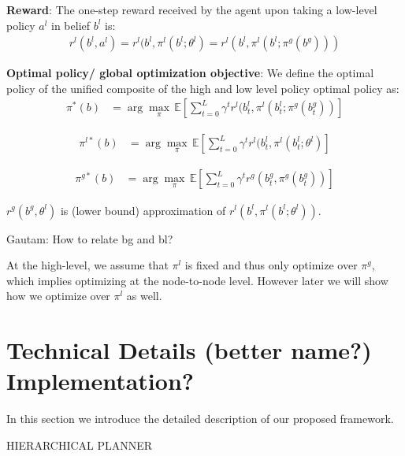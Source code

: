 \documentclass{article}
\newcommand{\ph}[1]{{\textbf{#1}:}} %
\newcommand{\gautam}[1]{{\color{cyan}Gautam: #1 }}
\begin{document}
\ph{Reward} The one-step reward received by the agent upon taking a low-level policy $a^l$ in belief $b^l$ is:
\begin{align}
    r^l(b^l, a^l) = r^l(b^l, \pi^l(b^l; \theta^l) = r^l(b^l, \pi^l(b^l; \pi^g(b^g)))
\end{align}

\ph{Optimal policy/ global optimization objective} We define the optimal policy of the unified composite of the high and low level policy optimal policy as:
\begin{align}
  \pi^{*}(b) &= \arg\max_\pi \, \mathbb{E} \left[ \sum_{t=0}^{L} \gamma^t r^l(b^l_t, \pi^l(b^l_t; \pi^g(b^g_t)) \right]
  \label{eq:optimal_policy_unified}
\end{align}

\begin{align}
  \pi^{l*}(b) &= \arg\max_\pi \, \mathbb{E} \left[ \sum_{t=0}^{L} \gamma^t r^l(b^l_t, \pi^l(b^l_t; \theta^l) \right]
  \label{eq:optimal_policy_lattice}
\end{align}

\begin{align}
  \pi^{g*}(b) &= \arg\max_\pi \, \mathbb{E} \left[ \sum_{t=0}^{L} \gamma^t r^g(b^g_t, \pi^g(b^g_t)) \right]
  \label{eq:optimal_policy_graph}
\end{align}

$r^g(b^g, \theta^l)$ is (lower bound) approximation of $r^l(b^l, \pi^l(b^l; \theta^l))$.

\gautam{How to relate bg and bl?}

At the high-level, we assume that $\pi^l$ is fixed and thus only optimize over $\pi^g$, which implies optimizing at the node-to-node level. However later we will show how we optimize over $\pi^l$ as well.




\section{Technical Details (better name?) Implementation?}

In this section we introduce the detailed description of our proposed framework.

HIERARCHICAL PLANNER
\end{document}
